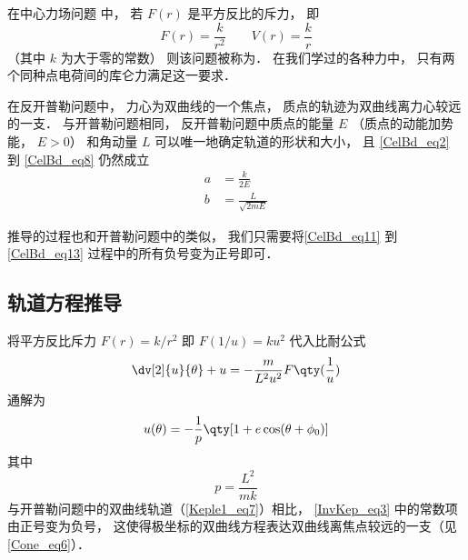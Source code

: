 

在中心力场问题 中， 若 $F(r)$ 是平方反比的斥力， 即
\begin{equation}
F(r) = \frac{k}{r^2}  \qquad V(r) = \frac{k}{r}
\end{equation}
（其中 $k$ 为大于零的常数） 则该问题被称为． 在我们学过的各种力中， 只有两个同种点电荷间的库仑力满足这一要求．

在反开普勒问题中， 力心为双曲线的一个焦点， 质点的轨迹为双曲线离力心较远的一支． 与开普勒问题相同， 反开普勒问题中质点的能量 $E$ （质点的动能加势能， $E>0$） 和角动量 $L$ 可以唯一地确定轨道的形状和大小， 且 \autoref{CelBd_eq2} 到 \autoref{CelBd_eq8} 仍然成立
\begin{align}
a &= \frac{k}{2E}\\
b &= \frac{L}{\sqrt{2mE}}
\end{align}

推导的过程也和开普勒问题中的类似， 我们只需要将\autoref{CelBd_eq11} 到\autoref{CelBd_eq13} 过程中的所有负号变为正号即可．

\subsection{轨道方程推导}

将平方反比斥力 $F(r) = k/r^2$ 即 $F(1/u) = ku^2$ 代入比耐公式
\begin{equation}
\dv[2]{u}{\theta} + u = -\frac{m}{L^2 u^2} F\qty(\frac 1u)
\end{equation}
通解为
\begin{equation}\label{InvKep_eq3}
u(\theta) = -\frac{1}{p} \qty[1 + e\cos(\theta  + \phi_0)]
\end{equation}
其中
\begin{equation}
p = \frac{L^2}{mk}
\end{equation}
与开普勒问题中的双曲线轨道（\autoref{Keple1_eq7}）相比， \autoref{InvKep_eq3} 中的常数项由正号变为负号， 这使得极坐标的双曲线方程表达双曲线离焦点较远的一支（见\autoref{Cone_eq6}）．